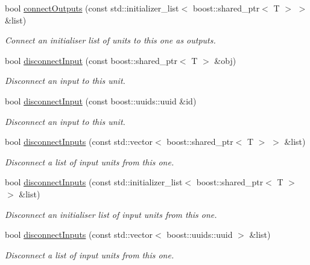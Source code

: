 \begin{DoxyCompactItemize}
bool \hyperlink{classcryomesh_1_1common_1_1Connector_a8fca74791240e711bdd6c89b26759390}{connect\-Outputs} (const std\-::initializer\-\_\-list$<$ boost\-::shared\-\_\-ptr$<$ \-T $>$ $>$ \&list)
\begin{DoxyCompactList}\small\item\em \-Connect an initialiser list of units to this one as outputs. \end{DoxyCompactList}\item 
bool \hyperlink{classcryomesh_1_1common_1_1Connector_a6726db121456485ea580ba7f9365bb37}{disconnect\-Input} (const boost\-::shared\-\_\-ptr$<$ \-T $>$ \&obj)
\begin{DoxyCompactList}\small\item\em \-Disconnect an input to this unit. \end{DoxyCompactList}\item 
bool \hyperlink{classcryomesh_1_1common_1_1Connector_a9de5eb37810b4d1563bff904b5bc545e}{disconnect\-Input} (const boost\-::uuids\-::uuid \&id)
\begin{DoxyCompactList}\small\item\em \-Disconnect an input to this unit. \end{DoxyCompactList}\item 
bool \hyperlink{classcryomesh_1_1common_1_1Connector_af37d582516d355642f6a14544f21e1b3}{disconnect\-Inputs} (const std\-::vector$<$ boost\-::shared\-\_\-ptr$<$ \-T $>$ $>$ \&list)
\begin{DoxyCompactList}\small\item\em \-Disconnect a list of input units from this one. \end{DoxyCompactList}\item 
bool \hyperlink{classcryomesh_1_1common_1_1Connector_aa6eb7d8ec6d50abeb7942ca4d3955927}{disconnect\-Inputs} (const std\-::initializer\-\_\-list$<$ boost\-::shared\-\_\-ptr$<$ \-T $>$ $>$ \&list)
\begin{DoxyCompactList}\small\item\em \-Disconnect an initialiser list of input units from this one. \end{DoxyCompactList}\item 
bool \hyperlink{classcryomesh_1_1common_1_1Connector_a8df62ec2ead7b69453c74398d8182a39}{disconnect\-Inputs} (const std\-::vector$<$ boost\-::uuids\-::uuid $>$ \&list)
\begin{DoxyCompactList}\small\item\em \-Disconnect a list of input units from this one. \end{DoxyCompactList}\item 

\end{DoxyCompactItemize}
